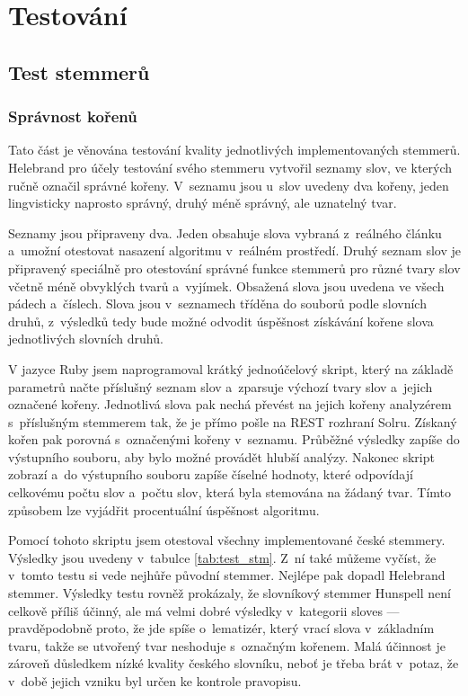 \chapter{Testování} \label{testing}
\section{Test stemmerů}
\subsection{Správnost kořenů}
Tato část je věnována testování kvality jednotlivých implementovaných stemmerů. Helebrand pro účely testování svého stemmeru vytvořil seznamy slov, ve kterých ručně označil správné kořeny. V~seznamu jsou u~slov uvedeny dva kořeny, jeden lingvisticky naprosto správný, druhý méně správný, ale uznatelný tvar.

Seznamy jsou připraveny dva. Jeden obsahuje slova vybraná z~reálného článku a~umožní otestovat nasazení algoritmu v~reálném prostředí. Druhý seznam slov je připravený speciálně pro otestování správné funkce stemmerů pro různé tvary slov včetně méně obvyklých tvarů a~vyjímek. Obsažená slova jsou uvedena ve všech pádech a~číslech. Slova jsou v~seznamech tříděna do souborů podle slovních druhů, z~výsledků tedy bude možné odvodit úspěšnost získávání kořene slova jednotlivých slovních druhů.

V jazyce Ruby jsem naprogramoval krátký jednoúčelový skript, který na základě parametrů načte příslušný seznam slov a~zparsuje výchozí tvary slov a~jejich označené kořeny. Jednotlivá slova pak nechá převést na jejich kořeny analyzérem s~příslušným stemmerem tak, že je přímo pošle na REST rozhraní Solru. Získaný kořen pak porovná s~označenými kořeny v~seznamu. Průběžné výsledky zapíše do výstupního souboru, aby bylo možné provádět hlubší analýzy. Nakonec skript zobrazí a~do výstupního souboru zapíše číselné hodnoty, které odpovídají celkovému počtu slov a~počtu slov, která byla stemována na žádaný tvar. Tímto způsobem lze vyjádřit procentuální úspěšnost algoritmu.

Pomocí tohoto skriptu jsem otestoval všechny implementované české stemmery. Výsledky jsou uvedeny v~tabulce \ref{tab:test_stm}. Z~ní také můžeme vyčíst, že v~tomto testu si vede nejhůře původní stemmer. Nejlépe pak dopadl Helebrand stemmer. Výsledky testu rovněž prokázaly, že slovníkový stemmer Hunspell není celkově příliš účinný, ale má velmi dobré výsledky v~kategorii sloves --- pravděpodobně proto, že jde spíše o~lematizér, který vrací slova v~základním tvaru, takže se utvořený tvar neshoduje s~označným kořenem. Malá účinnost je zároveň důsledkem nízké kvality českého slovníku, neboť je třeba brát v~potaz, že v~době jejich vzniku byl určen ke kontrole pravopisu.

